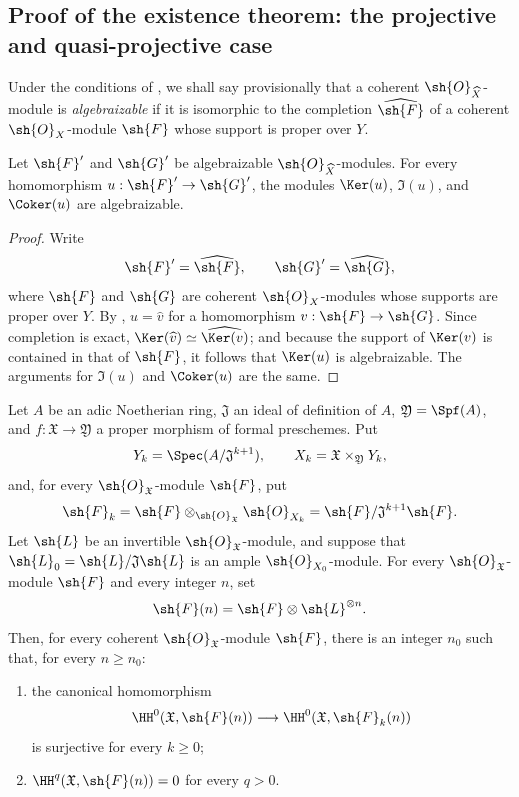 \subsection{Proof of the existence theorem: the projective and quasi-projective case}
\label{subsection:III.5.2}

\begin{env}[5.2.1]
\label{III.5.2.1}
Under the conditions of , we shall say
provisionally that a coherent $\sh{O}_{\widehat{X}}$-module is
\emph{algebraizable} if it is isomorphic to the completion
$\widehat{\sh{F}}$ of a coherent $\sh{O}_X$-module $\sh{F}$ whose
support is proper over $Y$.
\end{env}

\begin{lemma}[5.2.2]
\label{III.5.2.2}
Let $\sh{F}'$ and $\sh{G}'$ be algebraizable
$\sh{O}_{\widehat{X}}$-modules.  For every homomorphism
$u:\sh{F}'\to\sh{G}'$, the modules
$\Ker(u)$, $\Im(u)$, and $\Coker(u)$ are algebraizable.
\end{lemma}

\begin{proof}
Write
\[
  \sh{F}'=\widehat{\sh{F}},\qquad
  \sh{G}'=\widehat{\sh{G}},
\]
where $\sh{F}$ and $\sh{G}$ are coherent $\sh{O}_X$-modules whose
supports are proper over $Y$.  By ,
$u=\widehat{v}$ for a homomorphism
$v:\sh{F}\to\sh{G}$.  Since completion is exact,
$\Ker(\widehat{v})\simeq\widehat{\Ker(v)}$; and because the support
of $\Ker(v)$ is contained in that of $\sh{F}$, it follows that
$\Ker(u)$ is algebraizable.  The arguments for $\Im(u)$ and
$\Coker(u)$ are the same.
\end{proof}

\begin{proposition}[5.2.3]
\label{III.5.2.3}
Let $A$ be an adic Noetherian ring, $\mathfrak{J}$ an ideal of
definition of $A$, $\mathfrak{Y}=\Spf(A)$, and
$f:\mathfrak{X}\to\mathfrak{Y}$ a proper morphism of formal
preschemes.  Put
\[
  Y_k=\Spec(A/\mathfrak{J}^{k+1}),\qquad
  X_k=\mathfrak{X}\times_{\mathfrak{Y}}Y_k,
\]
and, for every $\sh{O}_{\mathfrak{X}}$-module $\sh{F}$, put
\[
  \sh{F}_k
  =
  \sh{F}\otimes_{\sh{O}_{\mathfrak{X}}}\sh{O}_{X_k}
  =
  \sh{F}/\mathfrak{J}^{k+1}\sh{F}.
\]
Let $\sh{L}$ be an invertible $\sh{O}_{\mathfrak{X}}$-module, and
suppose that
$\sh{L}_0=\sh{L}/\mathfrak{J}\sh{L}$ is an ample
$\sh{O}_{X_0}$-module.  For every
$\sh{O}_{\mathfrak{X}}$-module $\sh{F}$ and every integer $n$, set
\[
  \sh{F}(n)=\sh{F}\otimes\sh{L}^{\otimes n}.
\]
Then, for every coherent $\sh{O}_{\mathfrak{X}}$-module $\sh{F}$,
there is an integer $n_0$ such that, for every $n\geq n_0$:
\begin{enumerate}
  \item[\rm{(i)}] the canonical homomorphism
    \[
      \HH^0(\mathfrak{X},\sh{F}(n))
      \longrightarrow
      \HH^0(\mathfrak{X},\sh{F}_k(n))
    \]
    is surjective for every $k\geq0$;
  \item[\rm{(ii)}]
    $\HH^q(\mathfrak{X},\sh{F}(n))=0$ for every $q>0$.
\end{enumerate}
\end{proposition}

